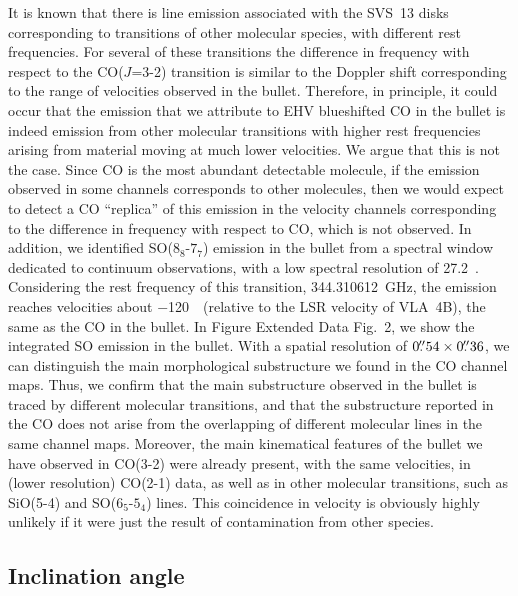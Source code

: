 \documentclass[12pt]{mythesis}
\begin{document}
 It is known that there is line emission associated with the SVS~13 disks corresponding to transitions of other molecular species, with different rest frequencies. For several of these transitions the difference in frequency with respect to the CO($J$=3-2) transition is similar to the Doppler shift corresponding to the range of velocities observed in the bullet. Therefore, in principle, it could occur that the emission that we attribute to EHV blueshifted CO in the bullet is indeed emission from other molecular transitions with higher rest frequencies arising from material moving at much lower velocities. We argue that this is not the case. Since CO is the most abundant detectable molecule, if the emission observed in some channels corresponds to other molecules, then we would expect to detect a CO ``replica'' of this emission in the velocity channels corresponding to the difference in frequency with respect to CO, which is not observed.
% 
 In addition, we identified SO($8_8$-$7_7$) emission in the bullet from a spectral window dedicated to continuum observations, with a low spectral resolution of 27.2~\kms. Considering the rest frequency of this transition, 344.310612~GHz, the emission reaches velocities about $-$120~\kms\ (relative to the LSR velocity of VLA~4B), the same as the CO in the bullet. In Figure Extended Data Fig.\ 2, we show the integrated SO emission in the bullet. With a spatial resolution of $0\mbox{$.\!\!^{\prime\prime}$}54 \times 0\mbox{$.\!\!^{\prime\prime}$}36$, we can distinguish the main morphological substructure we found in the CO channel maps. Thus, we confirm that the main substructure observed in the bullet is traced by different molecular transitions, and that the substructure reported in the CO does not arise from the overlapping of different molecular lines in the same channel maps.
 Moreover, the main kinematical features of the bullet we have observed in CO(3-2) were already present, with the same velocities, in (lower resolution) CO(2-1) data, as well as in other molecular transitions, such as SiO(5-4) and SO($6_5$-$5_4$) lines. This coincidence in velocity is obviously highly unlikely if it were just the result of contamination from other species.


\subsection{Inclination angle}
\end{document}
